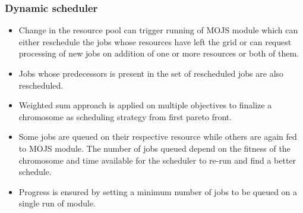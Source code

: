 \documentclass{beamer}
\newcommand\Fontdi{\fontsize{10}{6}\selectfont}
\begin{document}
\begin{frame}
\frametitle{Dynamic scheduler}
\Fontdi
\begin{itemize}
 \item Change in the resource pool can trigger running of MOJS module which can either reschedule the jobs whose resources have left the grid or can request processing of new jobs on addition of one or more resources or both of them. 
 \item Jobs whose predecessors is present in the set of rescheduled jobs are also rescheduled.
 \item Weighted sum approach is applied on multiple objectives to finalize a chromosome as scheduling strategy from first pareto front. 
 \item Some jobs are queued on their respective resource while others are again fed to MOJS module. The number of jobs queued depend on the fitness of the chromosome and time available for the scheduler to re-run and find a better schedule. 
 \item Progress is ensured by setting a minimum number of jobs to be queued on a single run of module.
\end{itemize}
\end{frame}
\end{document}
